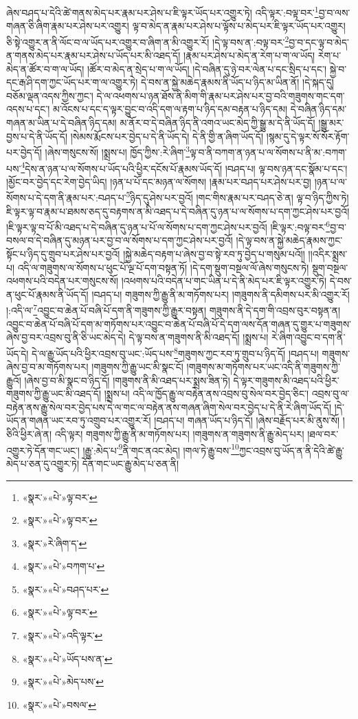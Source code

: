ཞེས་བཤད་པ་དེའི་ཚེ་གནས་མེད་པར་རྣམ་པར་ཤེས་པ་ཇི་ལྟར་ཡོད་པར་འགྱུར་ཏེ། འདི་ལྟར་:བལྟ་བར་\footnote{«སྣར་»«པེ་»ལྟ་བར་}བྱ་བ་ལས་གཞན་ཅི་ཞིག་རྣམ་པར་ཤེས་པར་འགྱུར། ལྟ་བ་མེད་ན་རྣམ་པར་ཤེས་པ་ལྟོས་པ་མེད་པར་ཇི་ལྟར་ཡོད་པར་འགྱུར། ཅི་སྟེ་འགྱུར་ན་ནི་ལོང་བ་ལ་ཡོད་པར་འགྱུར་བ་ཞིག་ན་མི་འགྱུར་རོ། །དེ་ལྟ་བས་ན་:བལྟ་བར་\footnote{«སྣར་»«པེ་»ལྟ་བར་}བྱ་བ་དང་ལྟ་བ་མེད་ན་གནས་མེད་པར་རྣམ་པར་ཤེས་པ་ཡོད་པར་མི་འཐད་དོ། །རྣམ་པར་ཤེས་པ་མེད་ན་རེག་པ་ག་ལ་ཡོད། རེག་པ་མེད་ན་ཚོར་བ་ག་ལ་ཡོད། །ཚོར་བ་མེད་ན་སྲེད་པ་ག་ལ་ཡོད། །དེ་བཞིན་དུ་ཉེ་བར་ལེན་པ་དང་སྲིད་པ་དང་། སྐྱེ་བ་དང་རྒ་ཤི་དག་ཀྱང་ཡོད་པར་ག་ལ་འགྱུར་ཏེ། དེ་བས་ན་སྐྱེ་མཆེད་རྣམས་ནི་ཡོད་པ་ཉིད་མ་ཡིན་ནོ། །དེ་སྐད་དུ། བཅོམ་ལྡན་འདས་ཀྱིས་ཀྱང་། དེ་ལ་འཕགས་པ་ཉན་ཐོས་ནི་མིག་གི་རྣམ་པར་ཤེས་པར་བྱ་བའི་གཟུགས་གང་དག་འདས་པ་དང་། མ་འོངས་པ་དང་ད་ལྟར་བྱུང་བ་འདི་དག་ལ་རྟག་པ་ཉིད་དམ་བརྟན་པ་ཉིད་དམ། དེ་བཞིན་ཉིད་དམ་གཞན་མ་ཡིན་པ་དེ་བཞིན་ཉིད་དམ། མ་ནོར་བ་དེ་བཞིན་ཉིད་ནི་འགའ་ཡང་མེད་ཀྱི་སྒྱུ་མ་དེ་ནི་ཡོད་དོ། །སྒྱུ་མར་བྱས་པ་དེ་ནི་ཡོད་དོ། །སེམས་རྨོངས་པར་བྱེད་པ་དེ་ནི་ཡོད་དེ། དེ་ནི་གྱི་ན་ཞིག་ཡོད་དོ། །སྙམ་དུ་དེ་ལྟར་སོ་སོར་རྟོག་པར་བྱེད་དོ། །ཞེས་གསུངས་སོ། །སྨྲས་པ། ཁྱོད་ཀྱིས་:རེ་ཞིག་\footnote{«སྣར་»རེ་ཞིག་ད་}ལྟ་བ་ནི་བཀག་ན་ཉན་པ་ལ་སོགས་པ་ནི་མ་:བཀག་པས་\footnote{«སྣར་»«པེ་»བཀག་པ་}དེས་ན་ཉན་པ་ལ་སོགས་པ་ཡོད་པའི་ཕྱིར་དངོས་པོ་རྣམས་ཡོད་དོ། །བཤད་པ། ལྟ་བས་ཉན་དང་སྣོམ་པ་དང་། །མྱོང་བར་བྱེད་དང་རེག་བྱེད་ཡིད། །ཉན་པ་པོ་དང་མཉན་ལ་སོགས། །རྣམ་པར་བཤད་པར་ཤེས་པར་བྱ། །ཉན་པ་ལ་སོགས་པ་དེ་དག་ནི་རྣམ་པར་:བཤད་པ་\footnote{«སྣར་»«པེ་»བཤད་པར་}ཉིད་དུ་ཤེས་པར་བྱའོ། །གང་གིས་རྣམ་པར་བཤད་ཅེ་ན། ལྟ་བ་ཉིད་ཀྱིས་ཏེ། ཇི་ལྟར་ལྟ་བ་རྣམ་པ་ཐམས་ཅད་དུ་བརྟགས་ན་མི་འཐད་པ་དེ་བཞིན་དུ་ཉན་པ་ལ་སོགས་པ་དག་ཀྱང་ཤེས་པར་བྱའོ། །ཇི་ལྟར་ལྟ་བ་པོ་མི་འཐད་པ་དེ་བཞིན་དུ་ཉན་པ་པོ་ལ་སོགས་པ་དག་ཀྱང་ཤེས་པར་བྱའོ། །ཇི་ལྟར་:བལྟ་བར་\footnote{«སྣར་»«པེ་»ལྟ་བར་}བྱ་བ་བསལ་བ་དེ་བཞིན་དུ་མཉན་པར་བྱ་བ་ལ་སོགས་པ་དག་ཀྱང་ཤེས་པར་བྱའོ། །དེ་ལྟ་བས་ན་སྐྱེ་མཆེད་རྣམས་ཀྱང་སྟོང་པ་ཉིད་དུ་གྲུབ་པར་ཤེས་པར་བྱའོ། །སྐྱེ་མཆེད་བརྟག་པ་ཞེས་བྱ་བ་སྟེ་རབ་ཏུ་བྱེད་པ་གསུམ་པའོ།། །།འདིར་སྨྲས་པ། འདི་ལ་གཟུགས་ལ་སོགས་པ་ཕུང་པོ་ལྔ་པོ་དག་བསྟན་ཏོ། །དེ་དག་སྡུག་བསྔལ་ལོ་ཞེས་གསུངས་ཏེ། སྡུག་བསྔལ་འཕགས་པའི་བདེན་པར་གསུངས་སོ། །འཕགས་པའི་བདེན་པ་གང་ཡིན་པ་དེ་ནི་མེད་པར་ཇི་ལྟར་འགྱུར་ཏེ། དེ་བས་ན་ཕུང་པོ་རྣམས་ནི་ཡོད་དོ། །བཤད་པ། གཟུགས་ཀྱི་རྒྱུ་ནི་མ་གཏོགས་པར། །གཟུགས་ནི་དམིགས་པར་མི་འགྱུར་རོ། །:འདི་ལ་\footnote{«སྣར་»«པེ་»འདི་ལྟར་}འབྱུང་བ་ཆེན་པོ་བཞི་པོ་དག་ནི་གཟུགས་ཀྱི་རྒྱུར་བསྟན། གཟུགས་ནི་དེ་དག་གི་འབྲས་བུར་བསྟན་ན། འབྱུང་བ་ཆེན་པོ་བཞི་པོ་དག་མ་གཏོགས་པར་འབྱུང་བ་ཆེན་པོ་བཞི་པོ་དེ་དག་ལས་དོན་གཞན་དུ་གྱུར་པ་གཟུགས་ཞེས་བྱ་བར་འབྲས་བུ་ནི་ཅི་ཡང་མེད་དེ། དེ་ལྟ་བས་ན་གཟུགས་ནི་མི་འཐད་དོ། །སྨྲས་པ། རེ་ཞིག་འབྱུང་བ་དག་ནི་ཡོད་དེ། དེ་ལ་རྒྱུ་ཡོད་པའི་ཕྱིར་འབྲས་བུ་ཡང་:ཡོད་པས་\footnote{«སྣར་»«པེ་»ཡོད་པས་ན་}གཟུགས་ཀྱང་རབ་ཏུ་གྲུབ་པ་ཉིད་དོ། །བཤད་པ། གཟུགས་ཞེས་བྱ་བ་མ་གཏོགས་པར། །གཟུགས་ཀྱི་རྒྱུ་ཡང་མི་སྣང་ངོ། །གཟུགས་མ་གཏོགས་པར་ཡང་འདི་ནི་གཟུགས་ཀྱི་རྒྱུའོ། །ཞེས་བྱ་བ་མི་སྣང་བ་ཉིད་དོ། །གཟུགས་ནི་མི་འཐད་པར་སྨྲས་ཟིན་ཏེ། དེ་ལྟར་གཟུགས་མི་འཐད་པའི་ཕྱིར་གཟུགས་ཀྱི་རྒྱུ་ཡང་མི་འཐད་དོ། །སྨྲས་པ། འདི་ལ་ཁྱོད་རྒྱུ་ལ་བརྟེན་ནས་འབྲས་བུ་སེལ་བར་བྱེད་ཅིང་། འབྲས་བུ་ལ་བརྟེན་ནས་རྒྱུ་སེལ་བར་བྱེད་པས་དེ་ལ་གང་ལ་བརྟེན་ནས་གཞན་ཞིག་སེལ་བར་བྱེད་པ་དེ་ནི་རེ་ཞིག་ཡོད་དོ། །དེ་ཡོད་ན་གཞན་ཡང་རབ་ཏུ་འགྲུབ་པར་འགྱུར་རོ། །བཤད་པ། གཞན་ཡོད་པ་ཉིད་དོ། །ཞེས་བརྗོད་པར་མི་ནུས་སོ། །ཅིའི་ཕྱིར་ཞེ་ན། འདི་ལྟར། གཟུགས་ཀྱི་རྒྱུ་ནི་མ་གཏོགས་པར། །གཟུགས་ན་གཟུགས་ནི་རྒྱུ་མེད་པར། །ཐལ་བར་འགྱུར་ཏེ་དོན་གང་ཡང་། །རྒྱུ་:མེད་པ་\footnote{«སྣར་»«པེ་»མེད་པས་}ནི་གང་ནའང་མེད། །གལ་ཏེ་རྒྱུ་བས་\footnote{«སྣར་»«པེ་»བསལ་}ཀྱང་འབྲས་བུ་ཡོད་ན་ནི་དེའི་ཚེ་རྒྱུ་མེད་པ་ཅན་དུ་འགྱུར་ཏེ། དོན་གང་ཡང་རྒྱུ་མེད་པ་ཅན་ནི། 